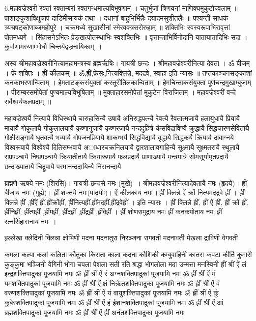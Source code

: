 6.महावज्रेश्वरी
रक्तां रक्ताम्बरां रक्तगन्धमाल्यविभूषणाम् । चतुर्भुजां त्रिणयनां माणिक्यमुकुटोज्वलाम् ॥
पाशाङ्कुशाविक्षुचापं दाडिमीसायकं तथा । दधानां बाहुभिर्भिन्नैः दयादमसुशीतलैः ॥
पश्यन्ती साधकं त्र्यश्रषट्कोणाब्जमहीपुरे । चक्रमध्ये सुखासीनां स्मेरवक्त्रसरोरुहाम् ॥
शक्तिभिः स्वस्वरूपाभिरावृत्तां पोतमध्यगे । सिंहासनेऽभितः प्रेङ्खत्पोतस्थाभिः स्वशक्तिभिः ॥
वृत्तान्ताभिर्विनोदानि यातायातादिभिः सदा । कुर्वाणामरुणाम्भोधौ चिन्तयेद्वज्रनायिकाम् ॥

अस्य श्रीमहावज्रेश्वरीनित्यामहामन्त्रस्य ब्रह्मर्ऋषिः। गायत्री छन्दः । श्रीमहावज्रेश्वरीनित्या देवता । ॐ बीजम् । फ्रें शक्तिः । ह्रीं कीलकम् ॥
ॐ,ह्रीं,फ्रेंसः,नित्यक्लिन्ने, मदद्रवे, स्वाहा इति   न्यासः ॥
तप्तकाञ्चनसङ्काशां कनकाभरणान्विताम् । हेमताटङ्कसंयुक्तां कस्तूरीतिलकान्विताम् ॥
हेमचिन्ताकसंयुक्तां पूर्णचन्द्रमुखाम्बुजाम् । पीराम्बरसमोपेतां पुण्यमाल्यविभूषिताम् ॥
मुक्ताहारसमोपेतां मुकुटेन विराजिताम् । महावज्रेश्वरीं वन्दे सर्वैश्वर्यफलप्रदाम् ॥

महावज्रेश्वर्यै नित्यायै विधिस्थायै चारुहासिन्यै उषायै अनिरुद्धपत्न्यै रेवत्यै रैवतात्मजायै हलायुधायै प्रियायै मायायै गोकुलायै गोकुलालयायै कृष्णानुजायै कृष्णरजायै नन्ददुहित्रे कंसविद्राविण्यै क्रुद्धायै सिद्धचारणसेवितायै गोक्षीराङ्गायै धृतवत्यै भव्यायै गोपजनप्रियायै शाकम्भर्यै सिद्धविद्यायै वृद्धायै सिद्धकर्यै क्रियायै दावाग्नये विश्वरूपायै विश्वेश्यै दितिसम्भवायै अाधारचक्रनिलयायै द्वारशालावगाहिन्यै सूक्ष्मायै सूक्ष्मतरायै स्थूलायै सप्रपञ्चायै निष्प्रपञ्चायै क्रियातीतायै क्रियारूपायै फलप्रदायै प्राणाख्यायै मन्त्रमात्रे सोमसूर्यामृतप्रदायै छन्दःख्यातायै चिद्रूपायै परमानन्ददायिन्यै
निरानन्दायै

ब्रह्मणे ऋषये नमः (शिरसि)। गायत्री-छन्दसे नमः (मुखे)~। श्रीमहावज्रेश्वरीनित्यादेवतायै नमः (हृदये)। ह्रीं बीजाय नमः (गुह्ये)।  ह्रीं शक्तये नमः(पादयोः)।
ऐं कीलकाय नमः॥
ह्रीं क्लिन्ने ऐं क्रों नित्यमदद्रवे ह्रीं ।
ह्रीं क्लिन्ने ह्रीं ,ह्रींऐं ह्रीं,ह्रींक्रोंह्रीं, ह्रींनित्यह्रीं,ह्रींमदह्रीं,ह्रींद्रवेह्रीं  । इति न्यासः ।
ह्रीं क्लिन्ने ह्रीं, ह्रीं ऐं ह्रीं, ह्रीं क्रों ह्रीं, ह्रींनिह्रीं, ह्रींत्यह्रीं ,ह्रींमह्रीं, ह्रींदह्रीं ,ह्रींद्रह्रीं ,ह्रींवेह्रीं । 
ह्रीं शोणसमुद्राय नमः ह्रीं कनकपोताय नमः ह्रीं रत्नसिंहासनाय नमः ।

हृल्लेखा क्लेदिनी क्लिन्ना क्षोभिणी मदना मदनातुरा निरञ्जना रागवती मदनावती मेखला द्राविणी वेगवती 

कमला कल्पा कलां कलिता कौतुका किराता काला कदना कौशिकी कम्बुवाहिनी कातरा कपटा कीर्ति कुमारी कुङ्कुमा भञ्जिनी वेगिनी भोगा चपला पेशला सती रति श्रद्धा भोगलोला मदा उन्मत्ता मनस्विनी 
 ह्रीं श्रीं ऐं लं इन्द्रशक्तिपादुकां पूजयामि नमः
ॐ ह्रीं श्रीं ऐं रं अग्नशक्तिपादुकां पूजयामि नमः
ॐ ह्रीं श्रीं ऐं मं यमशक्तिपादुकां पूजयामि नमः
ॐ ह्रीं श्रीं ऐं क्षं निर्ऋतशक्तिपादुकां पूजयामि नमः
ॐ ह्रीं श्रीं ऐं वं वरुणशक्तिपादुकां पूजयामि नमः
ॐ ह्रीं श्रीं ऐं यं वायुशक्तिपादुकां पूजयामि नमः
ॐ ह्रीं श्रीं ऐं कुं कुबेरशक्तिपादुकां पूजयामि नमः
ॐ ह्रीं श्रीं ऐं हं ईशानशक्तिपादुकां पूजयामि नमः
ॐ ह्रीं श्रीं ऐं आं ब्रह्मशक्तिपादुकां पूजयामि नमः
ॐ ह्रीं श्रीं ऐं ह्रीं अनंतशक्तिपादुकां पूजयामि नमः

